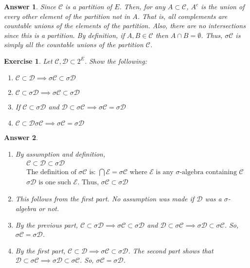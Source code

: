 \documentclass[12pt]{article}
\theoremstyle{colon}
\newtheorem{exercise}{Exercise}
\newtheorem*{answer}{Answer}
\begin{document}
\begin{answer}
  Since $\mathcal{C}$ is a partition of $E$. Then, for any $A \subset \mathcal{C}$, $A^c$ is the union of every other element of the partition not in $A$. That is, all complements are countable unions of the elements of the partition. Also, there are no intersections since this is a partition. By definition, if $A,B \in \mathcal{C}$ then $A \cap B = \emptyset$. Thus, $\sigma \mathcal{C}$ is simply all the countable unions of the partition $\mathcal{C}$.
\end{answer}

\clearpage

\begin{exercise}
  Let $\mathcal{C}, \mathcal{D} \subset 2^E$. Show the following:
  \begin{enumerate}[label=\roman*)]
    \item $\mathcal{C} \subset \mathcal{D} \implies \sigma\mathcal{C} \subset \sigma\mathcal{D}$
    \item $\mathcal{C} \subset \sigma\mathcal{D} \implies \sigma\mathcal{C} \subset \sigma\mathcal{D}$
    \item If $\mathcal{C} \subset \sigma\mathcal{D}$ and $\mathcal{D} \subset \sigma\mathcal{C} \implies \sigma\mathcal{C} = \sigma\mathcal{D}$
    \item $\mathcal{C} \subset \mathcal{D} \sigma\mathcal{C} \implies \sigma\mathcal{C} = \sigma\mathcal{D}$
  \end{enumerate}
\end{exercise}

\begin{answer}
  \leavevmode
  \begin{enumerate}[label=\roman*)]
    \item By assumption and definition,
      \begin{align*}
        &\mathcal{C} \subset \mathcal{D} \subset \sigma \mathcal{D} \\
        &\text{The definition of $\sigma \mathcal{C}$ is: } \bigcap \mathcal{E} = \sigma \mathcal{C} \text{ where $\mathcal{E}$ is any $\sigma$-algebra containing $\mathcal{C}$} \\
        &\sigma \mathcal{D} \text{ is one such $\mathcal{E}$. Thus, } \sigma \mathcal{C} \subset \sigma \mathcal{D}
      \end{align*}
    \item This follows from the first part. No assumption was made if $\mathcal{D}$ was a $\sigma$-algebra or not.
    \item By the previous part, $\mathcal{C} \subset \sigma\mathcal{D} \implies \sigma\mathcal{C} \subset \sigma\mathcal{D}$ and $\mathcal{D} \subset \sigma\mathcal{C} \implies \sigma\mathcal{D} \subset \sigma\mathcal{C}$. So, $\sigma\mathcal{C} = \sigma\mathcal{D}$.
    \item By the first part, $\mathcal{C} \subset \mathcal{D} \implies \sigma \mathcal{C} \subset \sigma \mathcal{D}$. The second part shows that $\mathcal{D} \subset \sigma\mathcal{C} \implies \sigma \mathcal{D} \subset \sigma \mathcal{C}$. So, $\sigma\mathcal{C} = \sigma\mathcal{D}$.
  \end{enumerate}
\end{answer}
\end{document}
